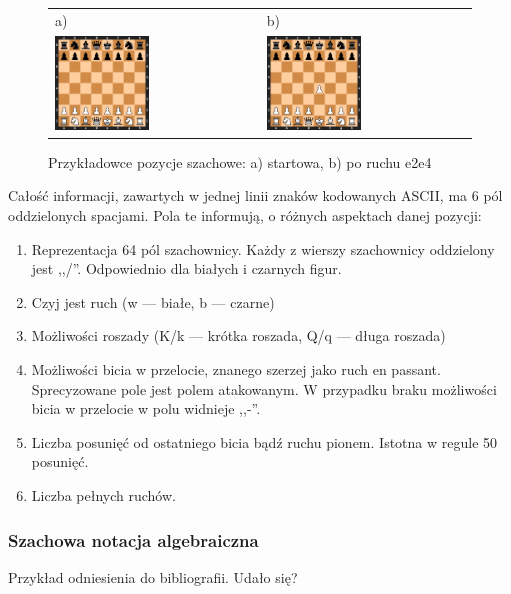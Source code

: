 \begin{figure}[htb]
    \centering
    \begin{tabular}{@{}ll@{}}
        a) & b) \\
        \includegraphics[width=0.475\textwidth]{rozdzialy/rozdzial01/1_uniwersalny-interfejs-szachowy/rysunki/pozycja_startowa}
        &
        \includegraphics[width=0.475\textwidth]{rozdzialy/rozdzial01/1_uniwersalny-interfejs-szachowy/rysunki/pozycja_startowa_e2e4}
    \end{tabular}
   \caption{Przykładowce pozycje szachowe: a) startowa, b) po ruchu e2e4}
    \label{fig: figure}
\end{figure}

Całość informacji, zawartych w jednej linii znaków kodowanych ASCII, ma 6 pól oddzielonych spacjami.
Pola te informują, o różnych aspektach danej pozycji:

\begin{enumerate}
    \item Reprezentacja 64 pól szachownicy.
    Każdy z wierszy szachownicy oddzielony jest ,,/''.
    Odpowiednio dla białych i czarnych figur.
    \item Czyj jest ruch (w — białe, b — czarne)
    \item Możliwości roszady (K/k — krótka roszada, Q/q — długa roszada)
    \item Możliwości bicia w przelocie, znanego szerzej jako ruch en passant.
    Sprecyzowane pole jest polem atakowanym.
    W przypadku braku możliwości bicia w przelocie w polu widnieje ,,-''.
    \item Liczba posunięć od ostatniego bicia bądź ruchu pionem.
    Istotna w regule 50 posunięć.
    \item Liczba pełnych ruchów.
\end{enumerate}

\subsubsection{Szachowa notacja algebraiczna}
Przykład odniesienia do bibliografii\cite{knuth1990, greenwade1993}.
Udało się?